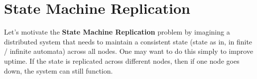 \section{State Machine Replication}

Let's motivate the \textbf{State Machine Replication}  problem by imagining a distributed system that needs to maintain a consistent state (state as in, in finite / infinite automata) across all nodes. One may want to do this simply to improve uptime. If the state is replicated across different nodes, then if one node goes down, the system can still function.
